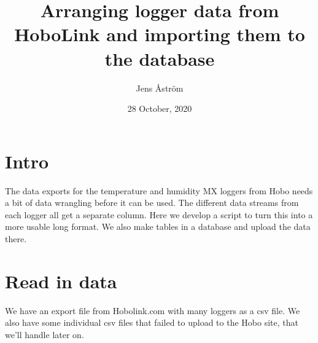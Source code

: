 \documentclass[]{article}
\title{Arranging logger data from HoboLink and importing them to the database}
\author{Jens Åström}
\date{28 October, 2020}
\newenvironment{Shaded}{\begin{snugshade}}{\end{snugshade}}
\newcommand{\DataTypeTok}[1]{\textcolor[rgb]{0.13,0.29,0.53}{#1}}
\newcommand{\KeywordTok}[1]{\textcolor[rgb]{0.13,0.29,0.53}{\textbf{#1}}}
\newcommand{\NormalTok}[1]{#1}
\newcommand{\OperatorTok}[1]{\textcolor[rgb]{0.81,0.36,0.00}{\textbf{#1}}}
\newcommand{\StringTok}[1]{\textcolor[rgb]{0.31,0.60,0.02}{#1}}
\begin{document}
\maketitle

{
\setcounter{tocdepth}{2}
\tableofcontents
}
\hypertarget{intro}{%
\section{Intro}\label{intro}}

The data exports for the temperature and humidity MX loggers from Hobo
needs a bit of data wrangling before it can be used. The different data
streams from each logger all get a separate column. Here we develop a
script to turn this into a more usable long format. We also make tables
in a database and upload the data there.

\hypertarget{read-in-data}{%
\section{Read in data}\label{read-in-data}}

We have an export file from Hobolink.com with many loggers as a csv
file. We also have some individual csv files that failed to upload to
the Hobo site, that we'll handle later on.

\begin{Shaded}
\end{Shaded}
\end{document}

